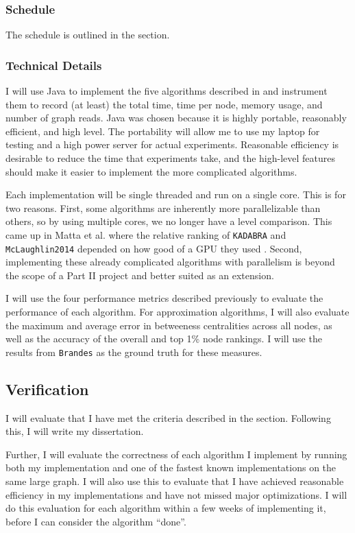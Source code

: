 \documentclass[a4paper,12pt]{article}
\begin{document}
\subsubsection*{Schedule}
The schedule is outlined in the  section.

\subsubsection*{Technical Details}

I will use Java to implement the five algorithms described in  and instrument them to record (at least) the total time, time per node, memory usage, and number of graph reads. Java was chosen because it is highly portable, reasonably efficient, and high level. The portability will allow me to use my laptop for testing and a high power server for actual experiments. Reasonable efficiency is desirable to reduce the time that experiments take, and the high-level features should make it easier to implement the more complicated algorithms.

Each implementation will be single threaded and run on a single core. This is for two reasons. First, some algorithms are inherently more parallelizable than others, so by using multiple cores, we no longer have a level comparison. This came up in Matta et al. where the relative ranking of \verb|KADABRA| and \verb|McLaughlin2014| depended on how good of a GPU they used \cite{comparesmall}. Second, implementing these already complicated algorithms with parallelism is beyond the scope of a Part II project and better suited as an extension.

I will use the four performance metrics described previously to evaluate the performance of each algorithm. For approximation algorithms, I will also evaluate the maximum and average error in betweeness centralities across all nodes, as well as the accuracy of the overall and top 1\% node rankings. I will use the results from \verb|Brandes| as the ground truth for these measures.

\subsection{Verification}

I will evaluate that I have met the criteria described in the  section. Following this, I will write my dissertation.

Further, I will evaluate the correctness of each algorithm I implement by running both my implementation and one of the fastest known implementations on the same large graph. I will also use this to evaluate that I have achieved reasonable efficiency in my implementations and have not missed major optimizations. I will do this evaluation for each algorithm within a few weeks of implementing it, before I can consider the algorithm ``done''.
\end{document}
